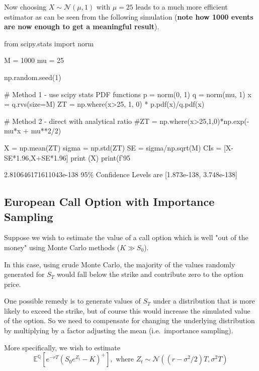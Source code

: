 Now choosing $X\sim\mathcal{N}(\mu, 1)$ with $\mu=25$ leads to a much more efficient estimator as can be seen from the following simulation (\textbf{note how 1000 events are now enough to get a
meaningful result}).

\begin{ipythonnon}
from scipy.stats import norm

M = 1000
mu = 25

np.random.seed(1)

# Method 1 - use scipy stats PDF functions
p = norm(0, 1)
q = norm(mu, 1)
x = q.rvs(size=M)
ZT = np.where(x>25, 1, 0) * p.pdf(x)/q.pdf(x)

# Method 2 - direct with analytical ratio
#ZT = np.where(x>25,1,0)*np.exp(-mu*x + mu**2/2)

X = np.mean(ZT)
sigma = np.std(ZT)
SE = sigma/np.sqrt(M)
CIs = [X-SE*1.96,X+SE*1.96]
print (X)
print(f'95%
\end{ipythonnon}
\begin{ioutput}
2.810646171611043e-138
95\% Confidence Levels are [1.873e-138, 3.748e-138]
\end{ioutput}

\subsection{European Call Option with Importance Sampling}
\label{sec:monte-carlo-european-call-option-with-importance-sampling}
	
Suppose we wish to estimate the value of a call option which is well "out of the money" using Monte Carlo methods ($K \gg S_0$).

In this case, using crude Monte Carlo, the majority of the values randomly generated for $S_T$ would fall below the strike and contribute zero to the option price.

One possible remedy is to generate values of $S_T$ under a distribution that is more likely to exceed the strike, but of course this would increase the simulated value of the option. So we need to
compensate for changing the underlying distribution by multiplying by a factor adjusting the mean (i.e.~importance sampling).

More specifically, we wish to estimate
\begin{equation}
\mathbb{E}^{\mathbb{Q}}[e^{-rT}(S_0e^{Z_t}-K)^+],\text{ where }Z_t\sim\mathcal{N}((r-\sigma^2/2)T,\sigma^2T)
\end{equation}

